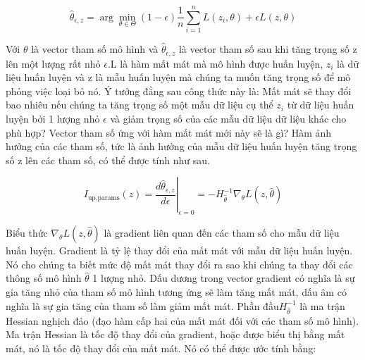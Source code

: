 $$\hat{\theta}_{\epsilon,z}=\arg\min_{\theta{}\in\Theta}(1-\epsilon)\frac{1}{n}\sum_{i=1}^n{}L(z_i,\theta)+\epsilon{}L(z,\theta)$$

Với \begin{math} \theta \end{math} là vector tham số mô hình và  \begin{math} \hat{\theta}_{\epsilon,z} \end{math} là vector tham số sau khi tăng trọng số z lên một lượng rất nhỏ \begin{math}\epsilon\end{math}.L là hàm mất mát mà mô hình được huấn luyện, \begin{math}z_i\end{math} là dữ liệu huấn luyện và z là mẫu huấn luyện mà chúng ta muốn tăng trọng số để mô phỏng việc loại bỏ nó. Ý tưởng đằng sau công thức này là: Mất mát sẽ thay đổi bao nhiêu nếu chúng ta tăng trọng số một mẫu dữ liệu cụ thể \begin{math} z_i \end{math} từ dữ liệu huấn luyện bởi 1 lượng nhỏ \begin{math}\epsilon\end{math} và giảm trọng số của các mẫu dữ liệu dữ liệu khác cho phù hợp? Vector tham số ứng với hàm mất mát mới này sẽ là gì? Hàm ảnh hưởng của các tham số, tức là ảnh hưởng của mẫu dữ liệu huấn luyện tăng trọng số z lên các tham số, có thể được tính như sau.

$$I_{\text{up,params}}(z)=\left.\frac{d{}\hat{\theta}_{\epsilon,z}}{d\epsilon}\right|_{\epsilon=0}=-H_{\hat{\theta}}^{-1}\nabla_{\theta}L(z,\hat{\theta})$$

Biểu thức \begin{math} \nabla_{\theta}L(z,\hat{\theta}) \end{math} là gradient liên quan đến các tham số cho mẫu dữ liệu huấn luyện. Gradient là tỷ lệ thay đổi của mất mát với mẫu dữ liệu huấn luyện. Nó cho chúng ta biết mức độ mất mát thay đổi ra sao khi chúng ta thay đổi các thông số mô hình \begin{math} \hat{\theta} \end{math} 1 lượng nhỏ. Dấu dương trong vector gradient có nghĩa là sự gia tăng nhỏ của tham số mô hình tương ứng sẽ làm tăng mất mát, dấu âm có nghĩa là sự gia tăng của tham số làm giảm mất mát. Phần đầu\begin{math} H^{-1}_{\hat{\theta}} \end{math} là ma trận Hessian nghịch đảo (đạo hàm cấp hai của mất mát đối với các tham số mô hình). Ma trận Hessian là tốc độ thay đổi của gradient, hoặc được biểu thị bằng mất mát, nó là tốc độ thay đổi của mất mát. Nó có thể được ước tính bằng:

